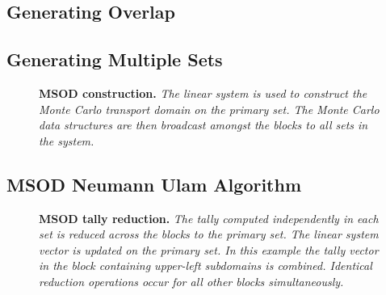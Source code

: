 \subsection{Generating Overlap }
\label{subsec:msod_overlap}

\subsection{Generating Multiple Sets }
\label{subsec:msod_sets}

\begin{figure}[htpb!]
  \begin{center}
    \scalebox{0.6}{  }
  \end{center}
  \caption{\textbf{MSOD construction.} \textit{The linear system is
      used to construct the Monte Carlo transport domain on the
      primary set. The Monte Carlo data structures are then broadcast
      amongst the blocks to all sets in the system.}}
  \label{fig:msod_construction}
\end{figure}

\subsection{MSOD Neumann Ulam Algorithm }
\label{subsec:msod_algorithm}

\begin{figure}[htpb!]
  \begin{center}
    \scalebox{0.6}{  }
  \end{center}
  \caption{\textbf{MSOD tally reduction.} \textit{The tally computed
      independently in each set is reduced across the blocks to the
      primary set. The linear system vector is updated on the primary
      set. In this example the tally vector in the block containing
      upper-left subdomains is combined. Identical reduction
      operations occur for all other blocks simultaneously.}}
  \label{fig:msod_tally_reduction}
\end{figure}

\clearpage

